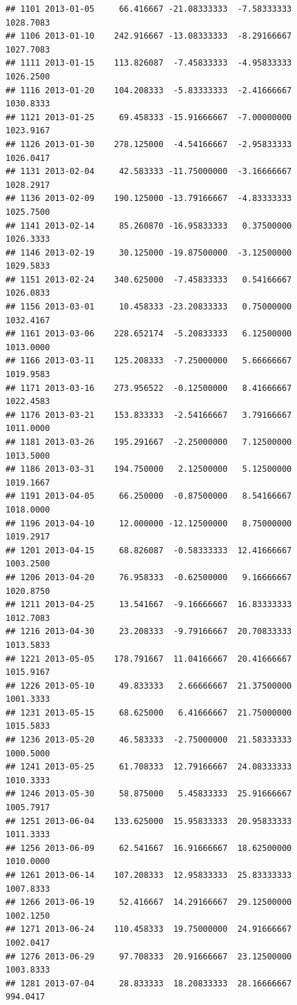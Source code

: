 \documentclass[
]{article}
\begin{document}
\begin{verbatim}
## 1101 2013-01-05     66.416667 -21.08333333  -7.58333333    1028.7083
## 1106 2013-01-10    242.916667 -13.08333333  -8.29166667    1027.7083
## 1111 2013-01-15    113.826087  -7.45833333  -4.95833333    1026.2500
## 1116 2013-01-20    104.208333  -5.83333333  -2.41666667    1030.8333
## 1121 2013-01-25     69.458333 -15.91666667  -7.00000000    1023.9167
## 1126 2013-01-30    278.125000  -4.54166667  -2.95833333    1026.0417
## 1131 2013-02-04     42.583333 -11.75000000  -3.16666667    1028.2917
## 1136 2013-02-09    190.125000 -13.79166667  -4.83333333    1025.7500
## 1141 2013-02-14     85.260870 -16.95833333   0.37500000    1026.3333
## 1146 2013-02-19     30.125000 -19.87500000  -3.12500000    1029.5833
## 1151 2013-02-24    340.625000  -7.45833333   0.54166667    1026.0833
## 1156 2013-03-01     10.458333 -23.20833333   0.75000000    1032.4167
## 1161 2013-03-06    228.652174  -5.20833333   6.12500000    1013.0000
## 1166 2013-03-11    125.208333  -7.25000000   5.66666667    1019.9583
## 1171 2013-03-16    273.956522  -0.12500000   8.41666667    1022.4583
## 1176 2013-03-21    153.833333  -2.54166667   3.79166667    1011.0000
## 1181 2013-03-26    195.291667  -2.25000000   7.12500000    1013.5000
## 1186 2013-03-31    194.750000   2.12500000   5.12500000    1019.1667
## 1191 2013-04-05     66.250000  -0.87500000   8.54166667    1018.0000
## 1196 2013-04-10     12.000000 -12.12500000   8.75000000    1019.2917
## 1201 2013-04-15     68.826087  -0.58333333  12.41666667    1003.2500
## 1206 2013-04-20     76.958333  -0.62500000   9.16666667    1020.8750
## 1211 2013-04-25     13.541667  -9.16666667  16.83333333    1012.7083
## 1216 2013-04-30     23.208333  -9.79166667  20.70833333    1013.5833
## 1221 2013-05-05    178.791667  11.04166667  20.41666667    1015.9167
## 1226 2013-05-10     49.833333   2.66666667  21.37500000    1001.3333
## 1231 2013-05-15     68.625000   6.41666667  21.75000000    1015.5833
## 1236 2013-05-20     46.583333  -2.75000000  21.58333333    1000.5000
## 1241 2013-05-25     61.708333  12.79166667  24.08333333    1010.3333
## 1246 2013-05-30     58.875000   5.45833333  25.91666667    1005.7917
## 1251 2013-06-04    133.625000  15.95833333  20.95833333    1011.3333
## 1256 2013-06-09     62.541667  16.91666667  18.62500000    1010.0000
## 1261 2013-06-14    107.208333  12.95833333  25.83333333    1007.8333
## 1266 2013-06-19     52.416667  14.29166667  29.12500000    1002.1250
## 1271 2013-06-24    110.458333  19.75000000  24.91666667    1002.0417
## 1276 2013-06-29     97.708333  20.91666667  23.12500000    1003.8333
## 1281 2013-07-04     28.833333  18.20833333  28.16666667     994.0417

\end{verbatim}
\end{document}
